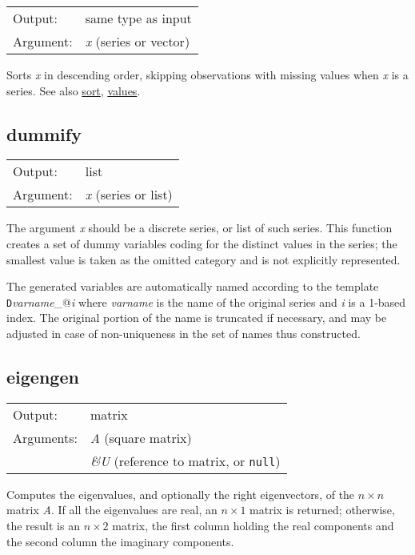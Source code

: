 \begin{tabular}{ll}
Output:     & same type as input\\
Argument:   & \textsl{x} (series or vector)\\
\end{tabular}

	  Sorts \textsl{x} in descending order, skipping
	  observations with missing values when \textsl{x} is a
	  series. 
	  See also \hyperlink{func-sort}{sort}, \hyperlink{func-values}{values}.

\subsection{dummify}
\hypertarget{func-dummify}{}

\begin{tabular}{ll}
Output:     & list\\
Argument:   & \textsl{x} (series or list)\\
\end{tabular}

	  The argument \textsl{x} should be a discrete series, or
	  list of such series.  This function creates a set of dummy variables
	  coding for the distinct values in the series; the smallest value is
	  taken as the omitted category and is not explicitly represented.

	  The generated variables are automatically named according to
	  the template
	  \texttt{D}\textsl{varname}\verb@_@\textsl{i} where
	  \textsl{varname} is the name of the original series and
	  \textsl{i} is a 1-based index.  The original portion of the name
	  is truncated if necessary, and may be adjusted in case of
	  non-uniqueness in the set of names thus constructed. 

\subsection{eigengen}
\hypertarget{func-eigengen}{}

\begin{tabular}{ll}
Output:     & matrix\\
Arguments:  & \textsl{A} (square matrix)\\
           & \textsl{\&U} (reference to matrix, or \texttt{null})\\
\end{tabular}

	  Computes the eigenvalues, and optionally the right eigenvectors, of
	  the \ensuremath{n\times n} matrix \textsl{A}.  If all the
	  eigenvalues are real, an \ensuremath{n\times 1} matrix is returned;
	  otherwise, the result is an \ensuremath{n\times 2} matrix, the first
	  column holding the real components and the second column the
	  imaginary components.

